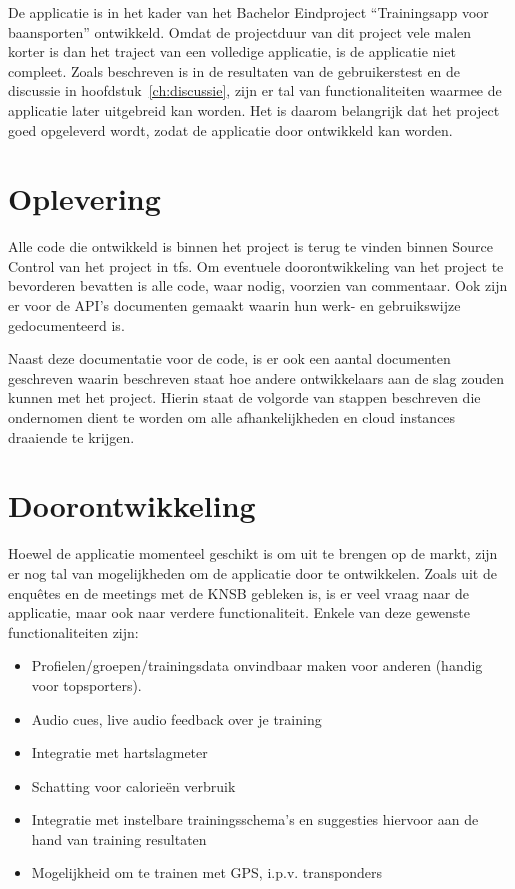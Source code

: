 De applicatie is in het kader van het Bachelor Eindproject ``Trainingsapp voor baansporten'' ontwikkeld. Omdat de projectduur van dit project vele malen korter is dan het traject van een volledige applicatie, is de applicatie niet compleet. Zoals beschreven is in de resultaten van de gebruikerstest en de discussie in hoofdstuk~\ref{ch:discussie}, zijn er tal van functionaliteiten waarmee de applicatie later uitgebreid kan worden. Het is daarom belangrijk dat het project goed opgeleverd wordt, zodat de applicatie door ontwikkeld kan worden.

\section{Oplevering}
Alle code die ontwikkeld is binnen het project is terug te vinden binnen Source Control van het project in \ac{tfs}.
Om eventuele doorontwikkeling van het project te bevorderen bevatten is alle code, waar nodig, voorzien van commentaar. Ook zijn er voor de API's documenten gemaakt waarin hun werk- en gebruikswijze gedocumenteerd is. 

Naast deze documentatie voor de code, is er ook een aantal documenten geschreven waarin beschreven staat hoe andere ontwikkelaars aan de slag zouden kunnen met het project. Hierin staat de volgorde van stappen beschreven die ondernomen dient te worden om alle afhankelijkheden en cloud instances draaiende te krijgen.

\section{Doorontwikkeling}
Hoewel de applicatie momenteel geschikt is om uit te brengen op de markt, zijn er nog tal van mogelijkheden om de applicatie door te ontwikkelen. Zoals uit de enquêtes en de meetings met de \ac{KNSB} gebleken is, is er veel vraag naar de applicatie, maar ook naar verdere functionaliteit. 
Enkele van deze gewenste functionaliteiten zijn:

\begin{itemize}
\item Profielen/groepen/trainingsdata onvindbaar maken voor anderen (handig voor topsporters).
\item Audio cues, live audio feedback over je training 
\item Integratie met hartslagmeter
\item Schatting voor calorieën verbruik
\item Integratie met instelbare trainingsschema's en suggesties hiervoor aan de hand van training resultaten
\item Mogelijkheid om te trainen met GPS, i.p.v. transponders
\end{itemize}

